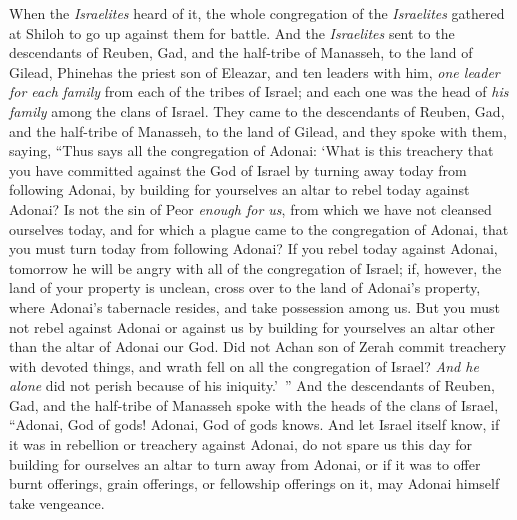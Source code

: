 \begin{biblechapter}
\verse When the \textit{Israelites} heard of it, the whole congregation of the \textit{Israelites} gathered at Shiloh to go up against them for battle.
\verse And the \textit{Israelites} sent to the descendants of Reuben, Gad, and the half-tribe of Manasseh, to the land of Gilead, Phinehas the priest son of Eleazar,
\verse and ten leaders with him, \textit{one leader for each} \textit{family} from each of the tribes of Israel; and each one was the head of \textit{his family} among the clans of Israel.
\verse They came to the descendants of Reuben, Gad, and the half-tribe of Manasseh, to the land of Gilead, and they spoke with them, saying,
\verse “Thus says all the congregation of Adonai: ‘What is this treachery that you have committed against the God of Israel by turning away today from following Adonai, by building for yourselves an altar to rebel today against Adonai?
\verse Is not the sin of Peor \textit{enough for us}, from which we have not cleansed ourselves today, and for which a plague came to the congregation of Adonai,
\verse that you must turn today from following Adonai? If you rebel today against Adonai, tomorrow he will be angry with all of the congregation of Israel;
\verse if, however, the land of your property is unclean, cross over to the land of Adonai’s property, where Adonai’s tabernacle resides, and take possession among us. But you must not rebel against Adonai or against us by building for yourselves an altar other than the altar of Adonai our God.
\verse Did not Achan son of Zerah commit treachery with devoted things, and wrath fell on all the congregation of Israel? \textit{And he alone} did not perish because of his iniquity.’ ”
\verse And the descendants of Reuben, Gad, and the half-tribe of Manasseh spoke with the heads of the clans of Israel,
\verse “Adonai, God of gods! Adonai, God of gods knows. And let Israel itself know, if it was in rebellion or treachery against Adonai, do not spare us this day
\verse for building for ourselves an altar to turn away from Adonai, or if it was to offer burnt offerings, grain offerings, or fellowship offerings on it, may Adonai himself take vengeance.

\end{biblechapter}
